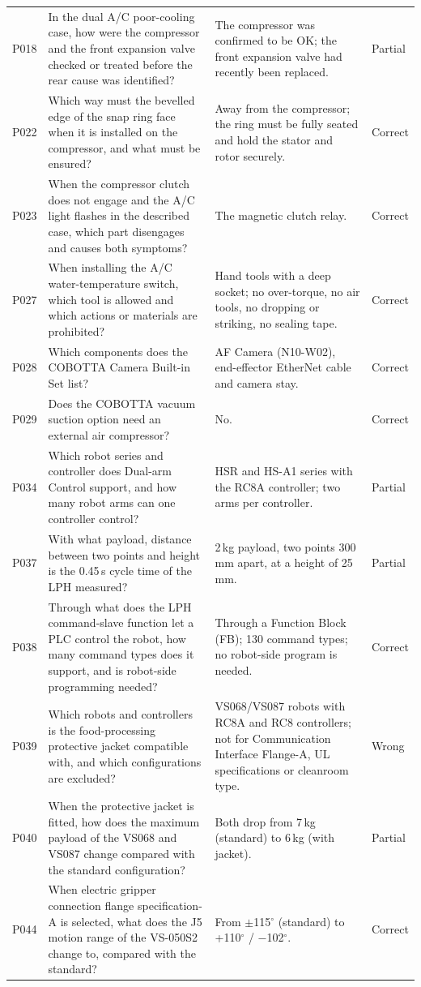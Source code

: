\begin{table}[t]
\begin{tabular}{@{}lp{}p{}l@{}}
P018 & In the dual A/C poor-cooling case, how were the compressor and the front expansion valve checked or treated before the rear cause was identified? & The compressor was confirmed to be OK; the front expansion valve had recently been replaced. & Partial \\
P022 & Which way must the bevelled edge of the snap ring face when it is installed on the compressor, and what must be ensured? & Away from the compressor; the ring must be fully seated and hold the stator and rotor securely. & Correct \\
P023 & When the compressor clutch does not engage and the A/C light flashes in the described case, which part disengages and causes both symptoms? & The magnetic clutch relay. & Correct \\
P027 & When installing the A/C water-temperature switch, which tool is allowed and which actions or materials are prohibited? & Hand tools with a deep socket; no over-torque, no air tools, no dropping or striking, no sealing tape. & Correct \\
P028 & Which components does the COBOTTA Camera Built-in Set list? & AF Camera (N10-W02), end-effector EtherNet cable and camera stay. & Correct \\
P029 & Does the COBOTTA vacuum suction option need an external air compressor? & No. & Correct \\
P034 & Which robot series and controller does Dual-arm Control support, and how many robot arms can one controller control? & HSR and HS-A1 series with the RC8A controller; two arms per controller. & Partial \\
P037 & With what payload, distance between two points and height is the 0.45\,s cycle time of the LPH measured? & 2\,kg payload, two points 300\,mm apart, at a height of 25\,mm. & Partial \\
P038 & Through what does the LPH command-slave function let a PLC control the robot, how many command types does it support, and is robot-side programming needed? & Through a Function Block (FB); 130 command types; no robot-side program is needed. & Correct \\
P039 & Which robots and controllers is the food-processing protective jacket compatible with, and which configurations are excluded? & VS068/VS087 robots with RC8A and RC8 controllers; not for Communication Interface Flange-A, UL specifications or cleanroom type. & Wrong \\
P040 & When the protective jacket is fitted, how does the maximum payload of the VS068 and VS087 change compared with the standard configuration? & Both drop from 7\,kg (standard) to 6\,kg (with jacket). & Partial \\
P044 & When electric gripper connection flange specification-A is selected, what does the J5 motion range of the VS-050S2 change to, compared with the standard? & From $\pm$115$^\circ$ (standard) to +110$^\circ$ / $-$102$^\circ$. & Correct \\
\bottomrule
\end{tabular}
\end{table}
